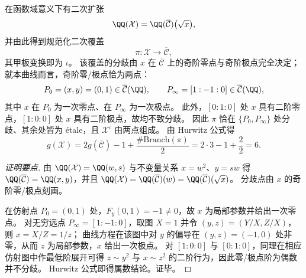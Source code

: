 \begin{proposition}[二次扩张与分歧：仅两处分歧且 \texorpdfstring{$g(\mathcal{X})=6$}{g(X)=6}]\label{prop:sync-hatdelta-curve-double-cover-branch-genus6}
在函数域意义下有二次扩张
\[
\QQ(\mathcal{X})=\QQ(\overline{\mathcal{C}})\bigl(\sqrt{x}\bigr),
\]
并由此得到规范化二次覆盖
\[
\pi:\mathcal{X}\longrightarrow\overline{\mathcal{C}},
\]
其甲板变换即为 \(\iota\)。
该覆盖的分歧由 \(x\) 在 \(\overline{\mathcal{C}}\) 上的奇阶零点与奇阶极点完全决定；
就本曲线而言，奇阶零/极点恰为两点：
\[
P_0=(x,y)=(0,1)\in \overline{\mathcal{C}}(\QQ),\qquad
P_\infty=[1:-1:0]\in \overline{\mathcal{C}}(\QQ),
\]
其中 \(x\) 在 \(P_0\) 为一次零点、在 \(P_\infty\) 为一次极点。
此外，\([0:1:0]\) 处 \(x\) 具有二阶零点，\([1:0:0]\) 处 \(x\) 具有二阶极点，故均不致分歧。
因此 \(\pi\) 恰在 \(\{P_0,P_\infty\}\) 处分歧、其余处皆为 \'{e}tale，且 \(\mathcal{X}^{\iota}\) 由两点组成。
由 Hurwitz 公式得
\[
g(\mathcal{X})
=2g(\overline{\mathcal{C}})-1+\frac{\#\mathrm{Branch}(\pi)}{2}
=2\cdot 3-1+\frac{2}{2}
=6.
\]
\end{proposition}
\begin{proof}[证明要点]
由 \(\QQ(\mathcal{X})=\QQ(w,s)\) 与不变量关系 \(x=w^2\)、\(y=sw\) 得 \(\QQ(\overline{\mathcal{C}})=\QQ(x,y)\)，并且 \(\QQ(\mathcal{X})=\QQ(\overline{\mathcal{C}})(w)=\QQ(\overline{\mathcal{C}})(\sqrt{x})\)。
分歧点由 \(x\) 的奇阶零/极点刻画。
\par
在仿射点 \(P_0=(0,1)\) 处，\(F_y(0,1)=-1\neq 0\)，故 \(x\) 为局部参数并给出一次零点。
对无穷远点 \(P_\infty=[1:-1:0]\)，取图 \(X=1\) 并令 \((y,z)=(Y/X,Z/X)\)，则 \(x=X/Z=1/z\)；
曲线方程在该图中对 \(y\) 的偏导在 \((y,z)=(-1,0)\) 处非零，从而 \(z\) 为局部参数，\(x\) 给出一次极点。
对 \([1:0:0]\) 与 \([0:1:0]\)，同理在相应仿射图中作最低阶展开可得 \(z\sim y^2\) 与 \(x\sim z^2\) 的二阶行为，因此零/极点阶为偶数并不分歧。
Hurwitz 公式即得属数结论。证毕。
\end{proof}

